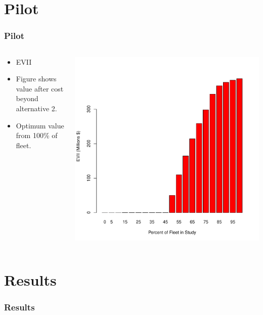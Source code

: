 \documentclass{beamer}
\begin{document}
\section{Pilot}
\begin{frame}
  \frametitle{Pilot}
  \begin{columns}
    \begin{column}{0.4\textwidth}
      \begin{itemize}
      \item EVII
      \item Figure shows value after cost beyond alternative 2.
      \item Optimum value from 100\% of fleet.
      \end{itemize}
    \end{column}
    \begin{column}{0.6\textwidth}
      \centering
      \includegraphics[width=\textwidth]{../../R/alt3barplot}
    \end{column}
  \end{columns}
\end{frame}

\section{Results}
\begin{frame}
  \frametitle{Results}

  \centering
\end{frame}
\end{document}
